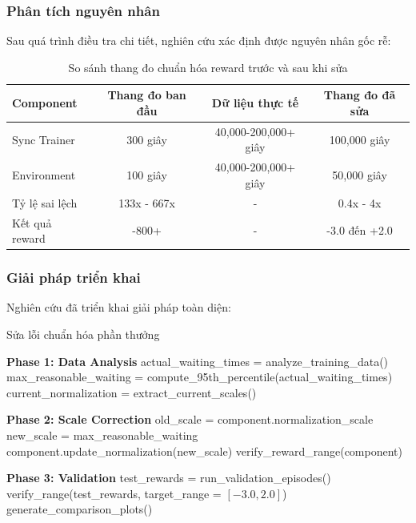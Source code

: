 \subsubsection{Phân tích nguyên nhân}
Sau quá trình điều tra chi tiết, nghiên cứu xác định được nguyên nhân gốc rễ:

\begin{table}[!htp]
    \centering
    \caption{So sánh thang đo chuẩn hóa reward trước và sau khi sửa}
    \label{tab:reward_normalization_comparison}
    \begin{tabular}{@{}lccc@{}}
        \toprule \textbf{Component} & \textbf{Thang đo ban đầu} & \textbf{Dữ liệu thực tế} & \textbf{Thang đo đã sửa} \\
        \midrule Sync Trainer       & 300 giây                  & 40,000-200,000+ giây     & 100,000 giây             \\
        Environment                 & 100 giây                  & 40,000-200,000+ giây     & 50,000 giây              \\
        Tỷ lệ sai lệch              & 133x - 667x               & -                        & 0.4x - 4x                \\
        Kết quả reward              & -800+                     & -                        & -3.0 đến +2.0            \\
        \bottomrule
    \end{tabular}
\end{table}

\subsubsection{Giải pháp triển khai}
Nghiên cứu đã triển khai giải pháp toàn diện:

\begin{algorithm}[!htp]
    \caption{Sửa lỗi chuẩn hóa phần thưởng}
    \begin{algorithmic}[1]
        \State \textbf{Phase 1: Data Analysis}
        \State actual\_waiting\_times = analyze\_training\_data()
        \State max\_reasonable\_waiting = compute\_95th\_percentile(actual\_waiting\_times)
        \State current\_normalization = extract\_current\_scales()
        
        \State \textbf{Phase 2: Scale Correction}
            \State old\_scale = component.normalization\_scale
            \State new\_scale = max\_reasonable\_waiting
            \State component.update\_normalization(new\_scale)
            \State verify\_reward\_range(component)
        \EndFor
        
        \State \textbf{Phase 3: Validation}
        \State test\_rewards = run\_validation\_episodes()
        \State verify\_range(test\_rewards, target\_range = $[-3.0, 2.0]$)
        \State generate\_comparison\_plots()
    \end{algorithmic}
\end{algorithm}

